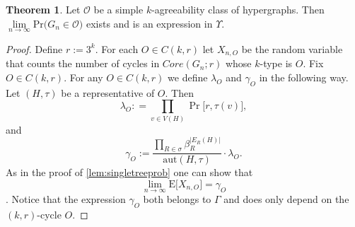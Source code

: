 \documentclass[12pt,notitlepage,a4paper]{article}
\theoremstyle{definition}
\newtheorem{theorem}{Theorem}[section]
\newcommand{\N}{\mathbb{N}}
\newcommand{\Ln}{\lim\limits_{n\to \infty}}
\newcommand{\PR}[1]{\mathrm{Pr}\big(#1\big)}
\newcommand{\aut}{\mathrm{aut}}
\begin{document}
\begin{theorem}\label{thm:agreeabilityprobabilities}
	Let $\mathcal{O}$ be a simple $k$-agreeability class
	of hypergraphs. Then 
	$\Ln \PR{G_n\in \mathcal{O}}$ exists and is an expression
	in $\Upsilon$. 
\end{theorem}
\begin{proof}
	Define $r:=3^k$. 
	For each $O\in C(k,r)$ let $X_{n,O}$ be the random variable
	that counts the number of cycles in $Core(G_n;r)$ 
	whose $k$-type is $O$. Fix $O\in C(k,r)$.
	For any $O\in C(k,r)$ we define $\lambda_O$ and 
	$\gamma_O$ in the following way. Let $(H,\tau)$ be
	a representative of $O$. Then
	\[ 
	\lambda_O:
	=\prod_{v\in V(H)}
	\Pr \big[ r, \tau(v) \big],
	\]
	and
	\[
	\gamma_O:=
	\frac{\prod_{R\in \sigma} \beta_R^{|E_R(H)|}}
	{\aut(H,\tau)}\cdot\lambda_O.
	\]	
	As in the proof of 
	\cref{lem:singletreeprob} one can show that
	\[
	\Ln \mathrm{E}\big[ X_{n,O}\big]
	= \gamma_O
	\].
	Notice that the expression $\gamma_O$ both belongs to $\Gamma$ and
	does only depend on the $(k,r)$-cycle $O$. \par
	

\end{proof}
\end{document}
